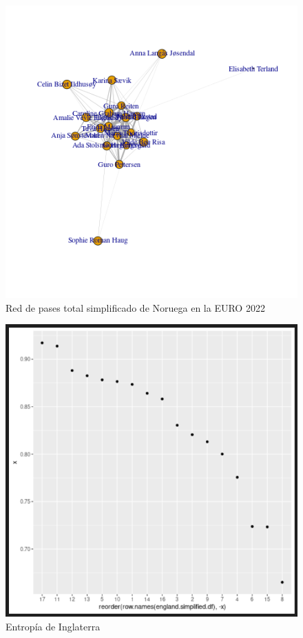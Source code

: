 \begin{figure}[h!]
    \centering
     \includegraphics[width=\textwidth]{./img/plot_norw_simpl.png}
     \caption{Red de pases total simplificado de Noruega en la EURO 2022}
     \label{img:red:nor}
\end{figure}

\begin{figure}[h!]
    \centering
     \includegraphics[width=\textwidth]{./img/englandentropy.png}
     \caption{Entropía de Inglaterra}
     \label{img:red:eng:ent}
\end{figure}

